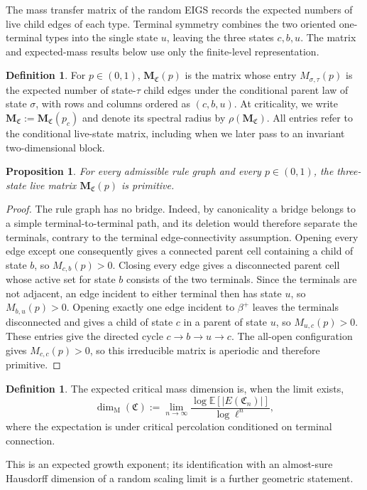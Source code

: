 \documentclass[scheme=plain,11pt]{ctexart}
\newtheorem{proposition}[theorem]{Proposition}
\theoremstyle{definition}
\newtheorem{definition}[theorem]{Definition}
\theoremstyle{remark}
\newcommand{\dimmass}{\dim_{\mathrm M}}
\begin{document}

The mass transfer matrix of the random EIGS records the expected numbers of live child edges of each type.
Terminal symmetry combines the two oriented one-terminal types into the single state $u$, leaving the three states $c,b,u$.
The matrix and expected-mass results below use only the finite-level representation.


\begin{definition}\label{def:live-matrix}
For $p\in(0,1)$, $\mathbf M_{\mathfrak C}(p)$ is the matrix whose entry $M_{\sigma,\tau}(p)$ is the expected number of state-$\tau$ child edges under the conditional parent law of state $\sigma$, with rows and columns ordered as $(c,b,u)$.
At criticality, we write $\mathbf M_{\mathfrak C}:=\mathbf M_{\mathfrak C}(p_c)$ and denote its spectral radius by $\rho(\mathbf M_{\mathfrak C})$.
All entries refer to the conditional live-state matrix, including when we later pass to an invariant two-dimensional block.
\end{definition}

\begin{proposition}\label{prop:live-matrix-primitive}
For every admissible rule graph and every $p\in(0,1)$, the three-state live matrix $\mathbf M_{\mathfrak C}(p)$ is primitive.
\end{proposition}

\begin{proof}
The rule graph has no bridge.
Indeed, by canonicality a bridge belongs to a simple terminal-to-terminal path, and its deletion would therefore separate the terminals, contrary to the terminal edge-connectivity assumption.
Opening every edge except one consequently gives a connected parent cell containing a child of state $b$, so $M_{c,b}(p)>0$.
Closing every edge gives a disconnected parent cell whose active set for state $b$ consists of the two terminals.
Since the terminals are not adjacent, an edge incident to either terminal then has state $u$, so $M_{b,u}(p)>0$.
Opening exactly one edge incident to $\beta^+$ leaves the terminals disconnected and gives a child of state $c$ in a parent of state $u$, so $M_{u,c}(p)>0$.
These entries give the directed cycle $c\to b\to u\to c$.
The all-open configuration gives $M_{c,c}(p)>0$, so this irreducible matrix is aperiodic and therefore primitive.
\end{proof}

\begin{definition}\label{def:critical-mass-dimension}
The expected critical mass dimension is, when the limit exists,
\[
 \dimmass(\mathfrak C):=\lim_{n\to\infty}
 \frac{\log\mathbb E[|E(\mathfrak C_n)|]}{\log\ell^n},
\]
where the expectation is under critical percolation conditioned on terminal connection.
\end{definition}
This is an expected growth exponent; its identification with an almost-sure Hausdorff dimension of a random scaling limit is a further geometric statement.
\end{document}
